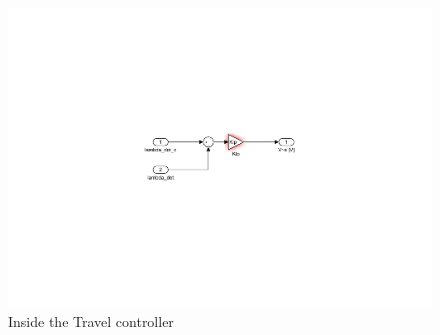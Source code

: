 \begin{figure}[!!ht!!!!!!!!tb!!]
	\centering
		\includegraphics[scale=1.1, trim={9.2cm 8cm 0cm 4cm},clip]{figures/simulink/P_controller.pdf}
	\caption{Inside the Travel controller}
\label{fig:P2p2_controller}
\end{figure}
\clearpage